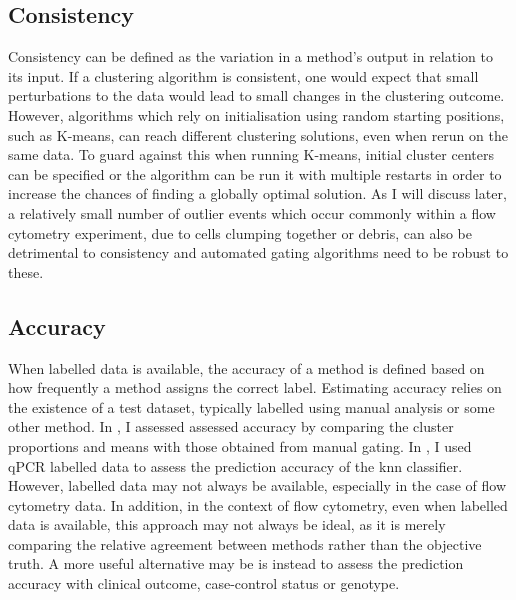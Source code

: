 \subsection{Consistency}
Consistency can be defined as the variation in a method's output in relation to its input.
If a clustering algorithm is consistent, one would expect that small perturbations to the data would lead to small changes in the clustering outcome.
However, algorithms which rely on initialisation using random starting positions, such as K-means, can reach different clustering solutions, even when rerun on the same data.
To guard against this when running K-means, initial cluster centers can be specified or the algorithm can be run it with multiple restarts in order to increase the chances of finding a globally optimal solution.
As I will discuss later, a relatively small number of outlier events which occur commonly within a flow cytometry experiment, due to cells clumping together or debris, can also be detrimental to consistency and automated gating algorithms need to be robust to these.

\subsection{Accuracy}
When labelled data is available, the accuracy of a method is defined based on how frequently a method assigns the correct label.
Estimating accuracy relies on the existence of a test dataset, typically labelled using manual analysis or some other method.
In , I assessed assessed accuracy by comparing the cluster proportions and means with those obtained from manual gating.
In , I used qPCR labelled data to assess the prediction accuracy of the \gls{knn} classifier.
However, labelled data may not always be available, especially in the case of flow cytometry data.
In addition, in the context of flow cytometry, even when labelled data is available, this approach may not always be ideal,
as it is merely comparing the relative agreement between methods rather than the objective truth.
A more useful alternative may be is instead to assess the prediction accuracy with clinical outcome, case-control status or genotype.

